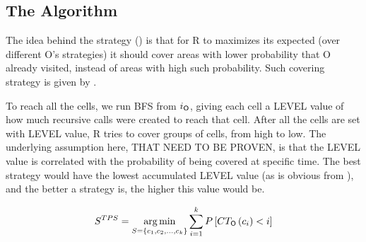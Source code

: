 \documentclass[a4paper,11pt]{article}
\theoremstyle{definition}
\newcommand{\rob}{{{\sf R}}\xspace}
\newcommand{\opp}{{{\sf O}}\xspace}
\newcommand{\fcc}{{{\sf{FCC}}}\xspace}
\newcommand{\ltr}{{{\sf{LTR}}}\xspace}
\DeclareMathOperator*{\argmin}{arg\,min} %
\begin{document}
\subsection{The \ltr Algorithm}
The idea behind the \ltr strategy () is that for \rob to maximizes its expected \fcc (over different \opp's strategies) it should cover areas with lower probability that \opp already visited, instead of areas with high such probability. Such covering strategy is given by .


To reach all the cells, we run BFS from $i_\opp$, giving each cell a LEVEL value of how much recursive calls were created to reach that cell.
After all the cells are set with LEVEL value, \rob tries to cover groups of cells, from high to low. %
The underlying assumption here, THAT NEED TO BE PROVEN, is that the LEVEL value is correlated with the probability of being covered at specific time. The best strategy would have the lowest accumulated LEVEL value (as is obvious from ), and the better a strategy is, the higher this value would be. 



\begin{equation}
    S^{TPS}=
    \argmin_{S=\left\{c_1,c_2,...,c_k\right\}} \sum_{i=1}^{k}{P\left[CT_{\opp}\left(c_i\right)<i\right]}
    \label{equations: TPS}
\end{equation}
\end{document}
